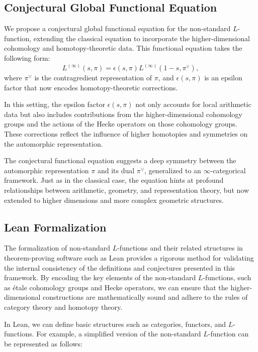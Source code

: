 \documentclass{article}
\theoremstyle{remark}
\begin{document}
\subsection{Conjectural Global Functional Equation}

We propose a conjectural global functional equation for the non-standard $L$-function, extending the classical equation to incorporate the higher-dimensional cohomology and homotopy-theoretic data. This functional equation takes the following form:
\[
L^{(\infty)}(s, \pi) = \epsilon(s, \pi) L^{(\infty)}(1 - s, \pi^\vee),
\]
where $\pi^\vee$ is the contragredient representation of $\pi$, and $\epsilon(s, \pi)$ is an epsilon factor that now encodes homotopy-theoretic corrections. 

In this setting, the epsilon factor $\epsilon(s, \pi)$ not only accounts for local arithmetic data but also includes contributions from the higher-dimensional cohomology groups and the actions of the Hecke operators on those cohomology groups. These corrections reflect the influence of higher homotopies and symmetries on the automorphic representation.

The conjectural functional equation suggests a deep symmetry between the automorphic representation $\pi$ and its dual $\pi^\vee$, generalized to an $\infty$-categorical framework. Just as in the classical case, the equation hints at profound relationships between arithmetic, geometry, and representation theory, but now extended to higher dimensions and more complex geometric structures.

\subsection{Lean Formalization}

The formalization of non-standard $L$-functions and their related structures in theorem-proving software such as Lean provides a rigorous method for validating the internal consistency of the definitions and conjectures presented in this framework. By encoding the key elements of the non-standard $L$-functions, such as étale cohomology groups and Hecke operators, we can ensure that the higher-dimensional constructions are mathematically sound and adhere to the rules of category theory and homotopy theory.

In Lean, we can define basic structures such as categories, functors, and $L$-functions. For example, a simplified version of the non-standard $L$-function can be represented as follows:
\end{document}
